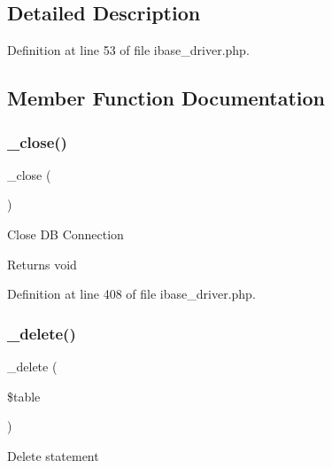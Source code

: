 \subsection{Detailed Description}


Definition at line 53 of file ibase\+\_\+driver.\+php.



\subsection{Member Function Documentation}
\mbox{\label{class_c_i___d_b__ibase__driver_a4d9082658000e5ede8312067c6dda9db}} 
\subsubsection{\texorpdfstring{\_close()}{\_close()}}
{\footnotesize\ttfamily \+\_\+close (\begin{DoxyParamCaption}{ }\end{DoxyParamCaption})\hspace{0.3cm}{\ttfamily [protected]}}

Close DB Connection

\begin{DoxyReturn}{Returns}
void 
\end{DoxyReturn}


Definition at line 408 of file ibase\+\_\+driver.\+php.

\mbox{\label{class_c_i___d_b__ibase__driver_a133ea8446ded52589bd22cc9163d0896}} 
\subsubsection{\texorpdfstring{\_delete()}{\_delete()}}
{\footnotesize\ttfamily \+\_\+delete (\begin{DoxyParamCaption}\item[{}]{\$table }\end{DoxyParamCaption})\hspace{0.3cm}{\ttfamily [protected]}}

Delete statement

